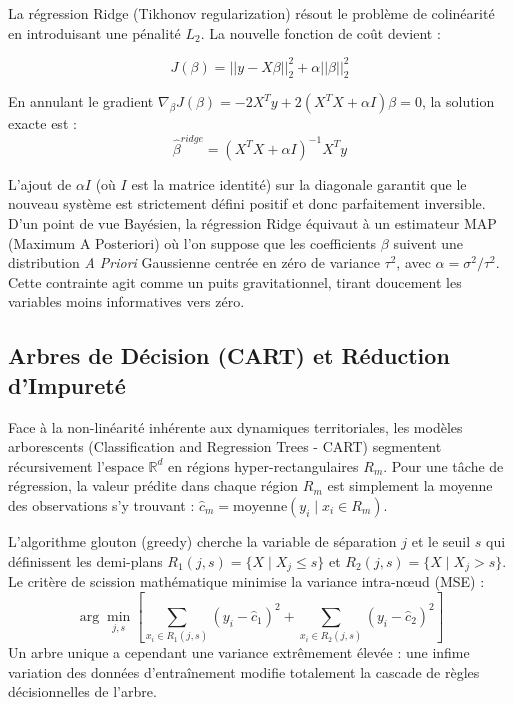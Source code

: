\documentclass[11pt,a4paper,twoside]{report}
\begin{document}
La régression Ridge (Tikhonov regularization) résout le problème de colinéarité en introduisant une pénalité $L_2$. La nouvelle fonction de coût devient :

\begin{equation}
J(\beta) = ||y - X\beta||^2_2 + \alpha ||\beta||^2_2 
\end{equation}

En annulant le gradient $\nabla_{\beta} J(\beta) = -2 X^T y + 2 (X^T X + \alpha I) \beta = 0$, la solution exacte est :
\begin{equation}
\hat{\beta}^{ridge} = (X^T X + \alpha I)^{-1} X^T y
\end{equation}

L'ajout de $\alpha I$ (où $I$ est la matrice identité) sur la diagonale garantit que le nouveau système est strictement défini positif et donc parfaitement inversible.
D'un point de vue Bayésien, la régression Ridge équivaut à un estimateur MAP (Maximum A Posteriori) où l'on suppose que les coefficients $\beta$ suivent une distribution \textit{A Priori} Gaussienne centrée en zéro de variance $\tau^2$, avec $\alpha = \sigma^2/\tau^2$. Cette contrainte agit comme un puits gravitationnel, tirant doucement les variables moins informatives vers zéro.

\subsection{Arbres de Décision (CART) et Réduction d'Impureté}

Face à la non-linéarité inhérente aux dynamiques territoriales, les modèles arborescents (Classification and Regression Trees - CART) segmentent récursivement l'espace $\mathbb{R}^d$ en régions hyper-rectangulaires $R_m$.
Pour une tâche de régression, la valeur prédite dans chaque région $R_m$ est simplement la moyenne des observations s'y trouvant : $\hat{c}_m = \text{moyenne}(y_i \mid x_i \in R_m)$.

L'algorithme glouton (greedy) cherche la variable de séparation $j$ et le seuil $s$ qui définissent les demi-plans $R_1(j,s) = \{X \mid X_j \le s\}$ et $R_2(j,s) = \{X \mid X_j > s\}$. Le critère de scission mathématique minimise la variance intra-nœud (MSE) :
\begin{equation}
\arg\min_{j,s} \left[ \sum_{x_i \in R_1(j,s)} (y_i - \hat{c}_1)^2 + \sum_{x_i \in R_2(j,s)} (y_i - \hat{c}_2)^2 \right]
\end{equation}
Un arbre unique a cependant une variance extrêmement élevée : une infime variation des données d'entraînement modifie totalement la cascade de règles décisionnelles de l'arbre.
\end{document}
